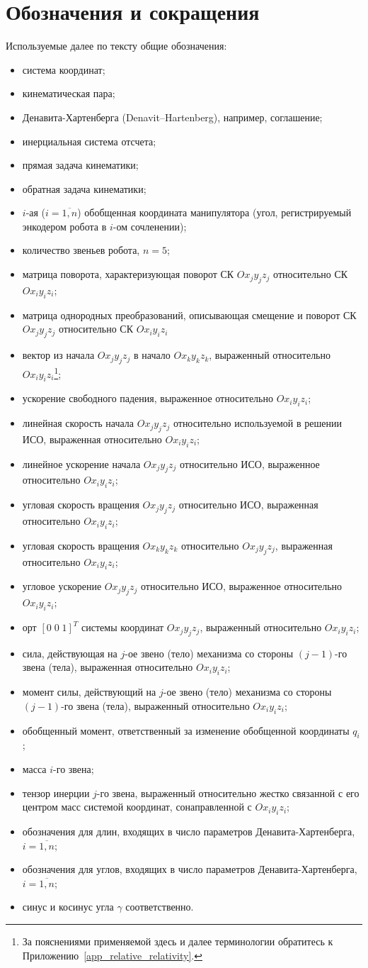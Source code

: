\section*{Обозначения и сокращения}
Используемые далее по тексту общие обозначения:
\newcommand*{\ditem}[1]{\item[#1~---]}
\begin{itemize}
\ditem{СК} система координат;
\ditem{КП} кинематическая пара;
\ditem{ДХ} Денавита-Хартенберга (Denavit–Hartenberg), например, соглашение;
\ditem{ИСО} инерциальная система отсчета;
\ditem{ПЗК} прямая задача кинематики;
\ditem{ОЗК} обратная задача кинематики;
\ditem{$q_i$} $i$-ая ($i=\overline{1,n}$) обобщенная координата манипулятора (угол, регистрируемый энкодером робота в $i$-ом сочленении);
\ditem{$n$} количество звеньев робота, $n = 5$;
\ditem{${}^iR_j$} матрица поворота, характеризующая поворот СК $Ox_{j}y_{j}z_{j}$ относительно СК $Ox_{i}y_{i}z_{i}$;
\ditem{${}^iA_j$} матрица однородных преобразований, описывающая смещение и поворот СК $Ox_{j}y_{j}z_{j}$ относительно СК $Ox_{i}y_{i}z_{i}$
\ditem{$r^i_{j,\,k}$} вектор из начала $Ox_{j}y_{j}z_{j}$ в начало $Ox_{k}y_{k}z_{k}$, выраженный относительно $Ox_{i}y_{i}z_{i}$\footnote{За пояснениями применяемой здесь и далее терминологии обратитесь к Приложению~\ref{app_relative_relativity}.};
\ditem{$g_i$} ускорение свободного падения, выраженное относительно $Ox_{i}y_{i}z_{i}$;
\ditem{$V^i_j$} линейная скорость начала $Ox_{j}y_{j}z_{j}$ относительно используемой в решении ИСО, выраженная относительно $Ox_{i}y_{i}z_{i}$;
\ditem{$a^i_j$} линейное ускорение начала $Ox_{j}y_{j}z_{j}$ относительно ИСО, выраженное относительно $Ox_{i}y_{i}z_{i}$;
\ditem{$\omega^i_j$} угловая скорость вращения $Ox_{j}y_{j}z_{j}$ относительно ИСО, выраженная относительно $Ox_{i}y_{i}z_{i}$;
\ditem{$\omega^i_{j,\,k}$} угловая скорость вращения $Ox_{k}y_{k}z_{k}$ относительно $Ox_{j}y_{j}z_{j}$, выраженная относительно $Ox_{i}y_{i}z_{i}$;
\ditem{$\dot\omega^i_j$} угловое ускорение $Ox_{j}y_{j}z_{j}$ относительно ИСО, выраженное относительно $Ox_{i}y_{i}z_{i}$;
\ditem{$z^i_j$} орт $[0\;0\;1]^T$ системы координат $Ox_{j}y_{j}z_{j}$, выраженный относительно $Ox_{i}y_{i}z_{i}$;
\ditem{$f^i_j$} сила, действующая на $j$-ое звено (тело) механизма со стороны $(j-1)$-го звена (тела), выраженная относительно $Ox_{i}y_{i}z_{i}$;
\ditem{$\tau^i_j$} момент силы, действующий на $j$-ое звено (тело) механизма со стороны ${(j-1)}$-го звена (тела), выраженный относительно $Ox_{i}y_{i}z_{i}$;
\ditem{$\tau_i$} обобщенный момент, ответственный за изменение обобщенной координаты $q_i$;
\ditem{$m_i$} масса $i$-го звена;
\ditem{$\mathcal{I}^i_j$} тензор инерции $j$-го звена, выраженный относительно жестко связанной с его центром масс системой координат, сонаправленной с $Ox_{i}y_{i}z_{i}$;
\ditem{$a_i, d_i$} обозначения для длин, входящих в число параметров Де\-на\-ви\-та-Хар\-тен\-бер\-га, $i=\overline{1,n}$;
\ditem{$\alpha_i, \theta_i$} обозначения для углов, входящих в число параметров Де\-на\-ви\-та-Хар\-тен\-бер\-га, $i=\overline{1,n}$;
\ditem{$s_\gamma, c_\gamma$} синус и косинус угла $\gamma$ соответственно.
\end{itemize}
\newpage
